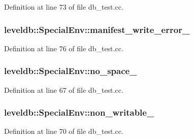 Definition at line 73 of file db\+\_\+test.\+cc.

\hypertarget{classleveldb_1_1_special_env_a7a6fafc967db1ba7594676d372b7fbec}{}
\subsubsection[{manifest\+\_\+write\+\_\+error\+\_\+}]{ leveldb\+::\+Special\+Env\+::manifest\+\_\+write\+\_\+error\+\_\+}\label{classleveldb_1_1_special_env_a7a6fafc967db1ba7594676d372b7fbec}


Definition at line 76 of file db\+\_\+test.\+cc.

\hypertarget{classleveldb_1_1_special_env_a21c9400bf22bd43f75349677b4d3413b}{}
\subsubsection[{no\+\_\+space\+\_\+}]{ leveldb\+::\+Special\+Env\+::no\+\_\+space\+\_\+}\label{classleveldb_1_1_special_env_a21c9400bf22bd43f75349677b4d3413b}


Definition at line 67 of file db\+\_\+test.\+cc.

\hypertarget{classleveldb_1_1_special_env_a3ecf4339c101366198febb32cfe938f0}{}
\subsubsection[{non\+\_\+writable\+\_\+}]{ leveldb\+::\+Special\+Env\+::non\+\_\+writable\+\_\+}\label{classleveldb_1_1_special_env_a3ecf4339c101366198febb32cfe938f0}


Definition at line 70 of file db\+\_\+test.\+cc.

